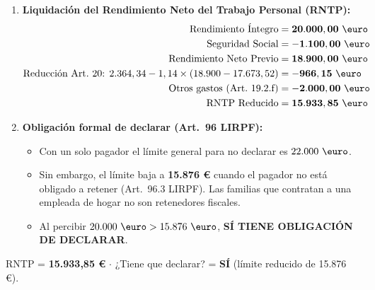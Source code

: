 \documentclass[11pt,a4paper,openany]{article}
\begin{document}
\begin{solucionBox}
\begin{enumerate}
    \item \textbf{Liquidación del Rendimiento Neto del Trabajo Personal (RNTP):}
    \begin{align*}
        \text{Rendimiento Íntegro} &= \mathbf{20.000,00\text{ \euro}} \\
        \text{Seguridad Social} &= -\mathbf{1.100,00\text{ \euro}} \\
        \mathbf{\text{Rendimiento Neto Previo}} &= \mathbf{18.900,00\text{ \euro}} \\
        \text{Reducción Art.~20: } 2.364,34 - 1,14 \times (18.900 - 17.673,52) &= -\mathbf{966,15\text{ \euro}} \\
        \text{Otros gastos (Art.~19.2.f)} &= -\mathbf{2.000,00\text{ \euro}} \\
        \mathbf{\text{RNTP Reducido}} &= \mathbf{15.933,85\text{ \euro}}
    \end{align*}

    \item \textbf{Obligación formal de declarar (Art.~96 LIRPF):}
    \begin{itemize}
        \item Con un solo pagador el límite general para no declarar es $22.000\text{ \euro}$.
        \item Sin embargo, el límite baja a \textbf{15.876 \euro} cuando el pagador no está obligado a retener (Art.~96.3 LIRPF). Las familias que contratan a una empleada de hogar no son retenedores fiscales.
        \item Al percibir $20.000\text{ \euro} > 15.876\text{ \euro}$, \textbf{SÍ TIENE OBLIGACIÓN DE DECLARAR}.
    \end{itemize}
\end{enumerate}
\end{solucionBox}

\begin{resultadoBox}
RNTP = \textbf{15.933,85 \euro} $\cdot$ ¿Tiene que declarar? = \textbf{SÍ} (límite reducido de 15.876 \euro).
\end{resultadoBox}

\newpage

\end{document}
